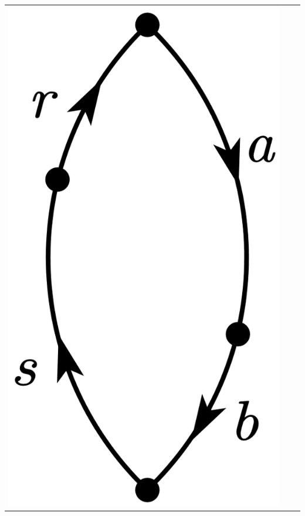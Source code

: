 \documentclass[a4paper]{book}
\newcounter{solution}[chapter]
\begin{document}
\begin{solution}
\begin{itemize}
\begin{center}
\begin{tabular}{ccc}
		\begin{minipage}{0.22\linewidth}
		\centering
		\includegraphics[scale=1.0,trim=0 -4 0 -4]{./pictures/6.07/diagram_4.png}
		\end{minipage} &
			

\end{tabular}
\end{center}
\end{itemize}
\end{solution}
\end{document}
